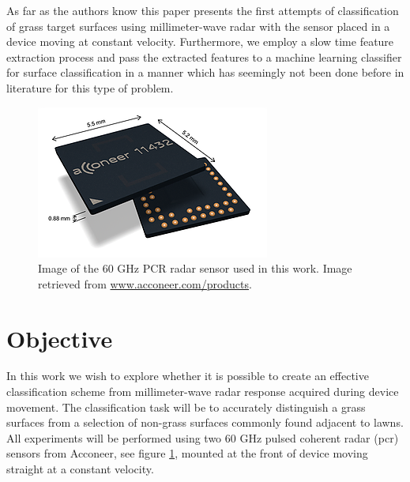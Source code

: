 
As far as the authors know this paper presents the first attempts of classification of grass target surfaces using millimeter-wave radar with the sensor placed in a device moving at constant velocity. Furthermore, we employ a slow time feature extraction process and pass the extracted features to a machine learning classifier for surface classification in a manner which has seemingly not been done before in literature for this type of problem. 

\begin{figure}
	\centering
	\includegraphics[scale=0.8]{figs_temp/acc_sensor}
	\caption{Image of the 60 GHz PCR radar sensor used in this work. Image retrieved from \url{www.acconeer.com/products}.}
	\label{fig:acc_sens}
\end{figure}

\section{Objective}

In this work we wish to explore whether it is possible to create an effective classification scheme from millimeter-wave radar response acquired during device movement. The classification task will be to accurately distinguish a grass surfaces from a selection of non-grass surfaces commonly found adjacent to lawns. All experiments will be performed using two 60 GHz pulsed coherent radar (\gls{pcr}) sensors from Acconeer, see figure \ref{fig:acc_sens}, mounted at the front of device moving straight at a constant velocity. 



